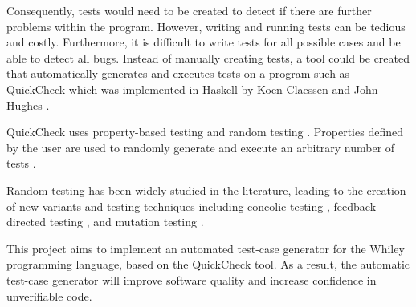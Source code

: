Consequently, tests would need to be created to detect if there are further problems within the program. However, writing and running tests can be tedious and costly. Furthermore, it is difficult to write tests for all possible cases and be able to detect all bugs. Instead of manually creating tests, a tool could be created that automatically generates and executes tests on a program such as QuickCheck which was implemented in Haskell by Koen Claessen and John Hughes \cite{QClightweight}.

QuickCheck uses property-based testing and random testing \cite{QClightweight}. Properties defined by the user are used to randomly generate and execute an arbitrary number of tests \cite{QClightweight}. 

Random testing has been widely studied in the literature, leading to the creation of new variants and testing techniques including concolic testing \cite{CUTE}, feedback-directed testing \cite{randoopAll}, \cite{randoopJava} and mutation testing \cite{evoSuite}.


This project aims to implement an automated test-case generator for the Whiley programming language, based on the QuickCheck tool. As a result, the automatic test-case generator will improve software quality and increase confidence in unverifiable code. 


